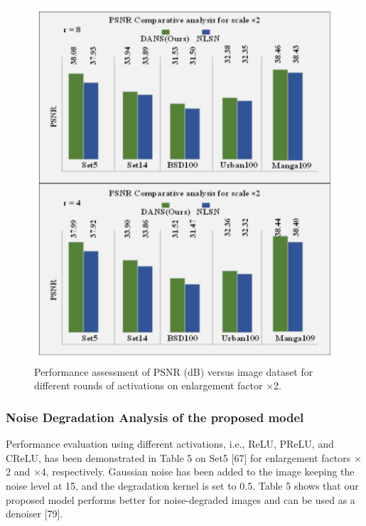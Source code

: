 \documentclass{ieeeaccess}
\begin{document}
\begin{figure}
  \includegraphics[width=\linewidth]{27FIGURE.pdf}
  \caption{Performance assessment of PSNR (dB) versus image dataset for different rounds of activations on enlargement factor $\times$2.}
  \label{fig:27}
\end{figure}

\subsubsection{Noise Degradation Analysis of the proposed model}

Performance evaluation using different activations, i.e., ReLU, PReLU, and CReLU, has been demonstrated in Table 5 on Set5 [67] for enlargement factors $\times$2 and $\times$4, respectively. Gaussian noise has been added to the image keeping the noise level at 15, and the degradation kernel is set to 0.5. Table 5 shows that our proposed model performs better for noise-degraded images and can be used as a denoiser [79].
\end{document}
